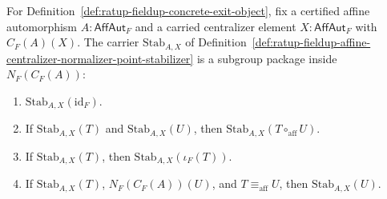 \begin{theorem}
\label{thm:ratup-fieldup-affine-centralizer-normalizer-point-stabilizer-subgroup}
For Definition~\ref{def:ratup-fieldup-concrete-exit-object}, fix a certified
affine automorphism $A:\mathsf{AffAut}_F$ and a carried centralizer element
$X:\mathsf{AffAut}_F$ with $C_F(A)(X)$. The carrier
$\mathrm{Stab}_{A,X}$ of
Definition~\ref{def:ratup-fieldup-affine-centralizer-normalizer-point-stabilizer}
is a subgroup package inside $N_F(C_F(A))$:
\begin{enumerate}
\item $\mathrm{Stab}_{A,X}(\mathrm{id}_F)$.
\item If $\mathrm{Stab}_{A,X}(T)$ and $\mathrm{Stab}_{A,X}(U)$, then
$\mathrm{Stab}_{A,X}(T\circ_{\mathrm{aff}}U)$.
\item If $\mathrm{Stab}_{A,X}(T)$, then
$\mathrm{Stab}_{A,X}(\iota_F(T))$.
\item If $\mathrm{Stab}_{A,X}(T)$, $N_F(C_F(A))(U)$, and
$T\equiv_{\mathrm{aff}}U$, then $\mathrm{Stab}_{A,X}(U)$.
\end{enumerate}
\end{theorem}
